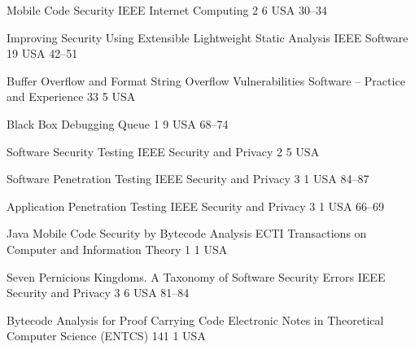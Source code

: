 \begin{thebibliography}{9}
		{
			\biband
			}
		{Mobile Code Security}
		{{IEEE} Internet Computing}
		{2}
		{6}
		{USA}
		{}
		{30--34}
	
		{
			\biband
			}
		{Improving Security Using Extensible Lightweight Static Analysis}
		{{IEEE} Software}
		{19}
		{}
		{USA}
		{}
		{42--51}
	
		{
			\biband
			}
		{Buffer Overflow and Format String Overflow Vulnerabilities}
		{Software -- Practice and Experience}
		{33}
		{5}
		{USA}
		{}
		{}
	
		{
			\biband
			}
		{Black Box Debugging}
		{Queue}
		{1}
		{9}
		{USA}
		{}
		{68--74}
	
		{
			\biband
			}
		{Software Security Testing}
		{{IEEE} Security and Privacy}
		{2}
		{5}
		{USA}
		{}
		{}
	
		{
			\biband
			\biband
			}
		{Software Penetration Testing}
		{{IEEE} Security and Privacy}
		{3}
		{1}
		{USA}
		{}
		{84--87}
	
		{}
		{Application Penetration Testing}
		{{IEEE} Security and Privacy}
		{3}
		{1}
		{USA}
		{}
		{66--69}
	
		{
			\biband
			\biband
			\biband
			}
		{Java Mobile Code Security by Bytecode Analysis}
		{{ECTI} Transactions on Computer and Information Theory}
		{1}
		{1}
		{USA}
		{}
		{}
	
		{
			\biband
			\biband
			}
		{Seven Pernicious Kingdoms. A Taxonomy of Software Security Errors}
		{{IEEE} Security and Privacy}
		{3}
		{6}
		{USA}
		{}
		{81--84}
	
		{
			\biband
			\biband
			}
		{Bytecode Analysis for Proof Carrying Code}
		{Electronic Notes in Theoretical Computer Science ({ENTCS})}
		{141}
		{1}
		{USA}
		{}
		{}
	

\end{thebibliography}
